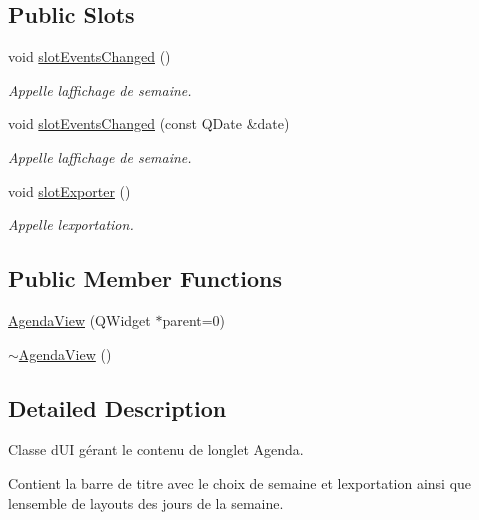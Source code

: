 \subsection*{Public Slots}
\begin{DoxyCompactItemize}
\item 
void \hyperlink{class_agenda_view_a4c460ccf9b4764f9422252199b7e8757}{slot\+Events\+Changed} ()
\begin{DoxyCompactList}\small\item\em Appelle l\textquotesingle{}affichage de semaine. \end{DoxyCompactList}\item 
void \hyperlink{class_agenda_view_a28d88cb1a112e93ad768e0846a0a18e6}{slot\+Events\+Changed} (const Q\+Date \&date)
\begin{DoxyCompactList}\small\item\em Appelle l\textquotesingle{}affichage de semaine. \end{DoxyCompactList}\item 
void \hyperlink{class_agenda_view_aff4eae25718bbfa2b1608cffd70341de}{slot\+Exporter} ()
\begin{DoxyCompactList}\small\item\em Appelle l\textquotesingle{}exportation. \end{DoxyCompactList}\end{DoxyCompactItemize}
\subsection*{Public Member Functions}
\begin{DoxyCompactItemize}
\item 
\hyperlink{class_agenda_view_afa7bce9852891d1bad22928c6feb4c5b}{Agenda\+View} (Q\+Widget $\ast$parent=0)
\item 
\hyperlink{class_agenda_view_ad7315a868714d98705c59efa5aa27bde}{$\sim$\+Agenda\+View} ()
\end{DoxyCompactItemize}


\subsection{Detailed Description}
Classe d\textquotesingle{}U\+I gérant le contenu de l\textquotesingle{}onglet Agenda. 

Contient la barre de titre avec le choix de semaine et l\textquotesingle{}exportation ainsi que l\textquotesingle{}ensemble de layouts des jours de la semaine. 

